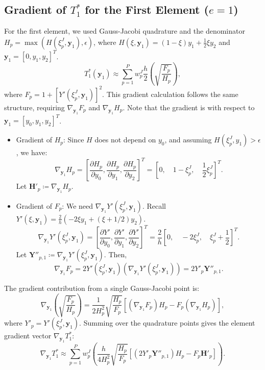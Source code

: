 \documentclass[11pt]{article}
\begin{document}
\subsection{Gradient of \( T_1^* \) for the First Element (\( e = 1 \))}
For the first element, we used Gauss-Jacobi quadrature and the denominator \( H_p = \max(H(\xi_{p}^{J}, \mathbf{y}_1), \epsilon) \), where \( H(\xi, \mathbf{y}_1) = (1-\xi)y_1 + \frac{1}{2}\xi y_2 \) and \( \mathbf{y}_1 = [0, y_1, y_2]^T \).
\[ 
    T_1^*(\mathbf{y}_1) \approx \sum_{p=1}^{P} w_{p}^{J} \frac{h}{2} \left( \sqrt{\frac{F_p}{H_p}} \right) ,
\]
where \( F_p = 1 + [Y'(\xi_p^J, \mathbf{y}_1)]^2 \). This gradient calculation follows the same structure, requiring \( \nabla_{\mathbf{y}_1} F_p \) and \( \nabla_{\mathbf{y}_1} H_p \). Note that the gradient is with respect to \( \mathbf{y}_1 = [y_0, y_1, y_2]^T \).

\begin{itemize}
    \item Gradient of \( H_p \): Since \( H \) does not depend on \( y_0 \), and assuming $ H(\xi^{J}_p , y_{1}) > \epsilon $, we have:
    \[ \nabla_{\mathbf{y}_1} H_p = \left[ \frac{\partial H_p}{\partial y_0}, \frac{\partial H_p}{\partial y_1}, \frac{\partial H_p}{\partial y_2} \right]^T = \left[ 0, \quad 1-\xi_p^{J}, \quad \frac{1}{2}\xi_p^{J} \right]^T. \]
    Let \( \mathbf{H}'_p \coloneqq \nabla_{\mathbf{y}_1} H_p \).
    \item Gradient of \( F_p \): We need \( \nabla_{\mathbf{y}_1} Y'(\xi_p^J, \mathbf{y}_1) \). Recall 
    \( Y'(\xi, \mathbf{y}_1) = \frac{2}{h} ( -2\xi y_1 + (\xi + 1/2) y_2 ) \).
    \[ \nabla_{\mathbf{y}_1} Y'(\xi_p^J, \mathbf{y}_1) = \left[ \frac{\partial Y'}{\partial y_0}, \frac{\partial Y'}{\partial y_1}, \frac{\partial Y'}{\partial y_2} \right]^T = \frac{2}{h} \left[ 0, \quad -2\xi_p^{J}, \quad \xi_p^{J}+\frac{1}{2} \right]^T. \]
    Let \( \mathbf{Y}''_{p,1} \coloneqq \nabla_{\mathbf{y}_1} Y'(\xi_p^J, \mathbf{y}_1) \). Then,
    \[ \nabla_{\mathbf{y}_1} F_p = 2 Y'(\xi_p^J, \mathbf{y}_1) (\nabla_{\mathbf{y}_1} Y'(\xi_p^J, \mathbf{y}_1)) = 2 Y'_p \mathbf{Y}''_{p,1}. \]
\end{itemize}

The gradient contribution from a single Gauss-Jacobi point is:
\[ 
    \nabla_{\mathbf{y}_1} \left( \sqrt{\frac{F_p}{H_p}} \right) = \frac{1}{2 H_p^2} \sqrt{\frac{H_p}{F_p}} \left[ (\nabla_{\mathbf{y}_1} F_p) H_p - F_p (\nabla_{\mathbf{y}_1} H_p) \right],
\]
where \( Y'_p = Y'(\xi_p^J, \mathbf{y}_1) \). Summing over the quadrature points gives the element gradient vector \( \nabla_{\mathbf{y}_1} T_1^* \):
\begin{equation}
    \nabla_{\mathbf{y}_1} T_1^* \approx \sum_{p=1}^{P} w_{p}^{J} \left( \frac{h}{4 H_p^2} \sqrt{\frac{H_p}{F_p}} \left[ (2 Y'_p \mathbf{Y}''_{p,1}) H_p - F_p \mathbf{H}'_p \right] \right). \label{eq:gradT1}
\end{equation}
\end{document}
